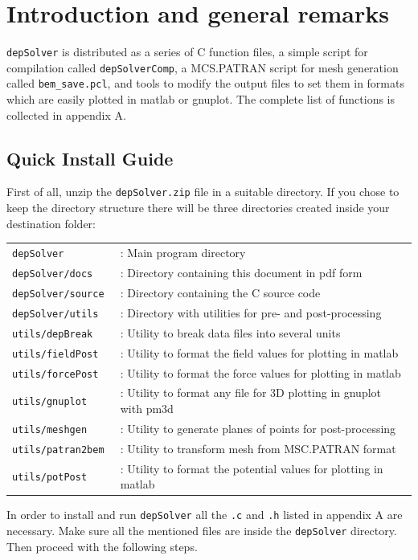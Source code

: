 \documentclass[12pt]{article}
\begin{document}
\tableofcontents
\pagebreak

\section{Introduction and general remarks}
\verb+depSolver+ is distributed as a series of C function files, a simple script for compilation called \verb+depSolverComp+, a MCS.PATRAN script for mesh generation called \verb+bem_save.pcl+, and tools to modify the output files to set them in formats which are easily plotted in matlab or gnuplot. The complete list of functions is collected in appendix A.

\subsection{Quick Install Guide}
First of all, unzip the \verb+depSolver.zip+ file in a suitable directory. If you chose to keep the directory structure there will be three directories created inside your destination folder:

\begin{tabular}{ll}
\texttt{depSolver}&: Main program directory\\
\texttt{depSolver/docs}&: Directory containing this document in pdf form\\
\texttt{depSolver/source}&: Directory containing the C source code\\
\texttt{depSolver/utils}&: Directory with utilities for pre- and post-processing\\
\texttt{utils/depBreak}&: Utility to break data files into several units\\
\texttt{utils/fieldPost}&: Utility to format the field values for plotting in matlab\\
\texttt{utils/forcePost}&: Utility to format the force values for plotting in matlab\\
\texttt{utils/gnuplot}&: Utility to format any file for 3D plotting in gnuplot with pm3d\\
\texttt{utils/meshgen}&: Utility to generate planes of points for post-processing\\
\texttt{utils/patran2bem }&: Utility to transform mesh from MSC.PATRAN format\\
\texttt{utils/potPost}&: Utility to format the potential values for plotting in matlab\\
\end{tabular}

In order to install and run \verb+depSolver+ all the \verb+.c+ and \verb+.h+ listed in appendix A are necessary. Make sure all the mentioned files are inside the \verb+depSolver+ directory. Then proceed with the following steps.
\end{document}
